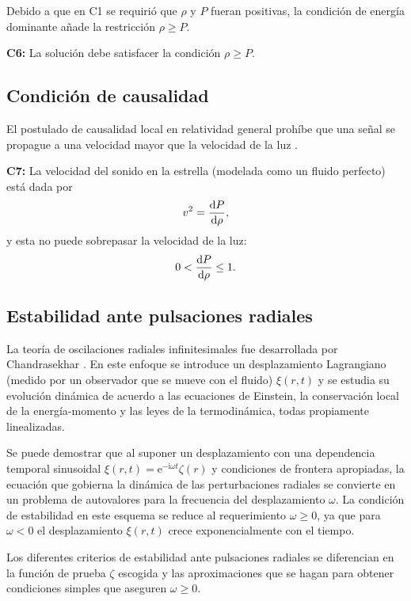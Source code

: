 Debido a que en C1 se requirió que $\rho$ y $P$ fueran positivas, la condición de energía dominante añade la restricción $\rho \geq P$.

\textbf{C6:} La solución debe satisfacer la condición $\rho \geq P$.

\subsection*{Condición de causalidad}
El postulado de causalidad local en relatividad general prohíbe que una señal se propague a una velocidad mayor que la velocidad de la luz \cite{Hawking1973}. 

\textbf{C7:}  La velocidad del sonido en la estrella (modelada como un fluido perfecto) está dada por 
\begin{equation}
    v^2=\dv{P}{\rho},
\end{equation}
y esta no puede sobrepasar la velocidad de la luz:
\begin{equation}
    0 < \dv{P}{\rho} \leq 1 .
\end{equation}

\subsection*{Estabilidad ante pulsaciones radiales}

La teoría de oscilaciones radiales infinitesimales fue desarrollada por Chandrasekhar \cite{Chandrasekhar1964a}. En este enfoque se introduce un desplazamiento Lagrangiano (medido por un observador que se mueve con el fluido) $\xi(r,t)$ y se estudia su evolución dinámica de acuerdo a las ecuaciones de Einstein, la conservación local de la energía-momento y las leyes de la termodinámica, todas propiamente linealizadas.

Se puede demostrar \cite{Chandrasekhar1964a,Misner1973} que al suponer un desplazamiento con una dependencia temporal sinusoidal $\xi(r, t)=\mathrm{e}^{-\mathrm{i} \omega t} \zeta(r)$  y condiciones de frontera apropiadas, la ecuación que gobierna la dinámica de las perturbaciones radiales se convierte en un problema de autovalores para la frecuencia del desplazamiento $\omega$. La condición de estabilidad en este esquema se reduce al requerimiento $\omega \geq 0$, ya que para $\omega<0$ el desplazamiento $\xi(r,t)$ crece exponencialmente con el tiempo.   

Los diferentes criterios de estabilidad ante pulsaciones radiales se diferencian en la función de prueba $\zeta$ escogida y las aproximaciones que se hagan para obtener condiciones simples que aseguren $\omega \geq 0$.



